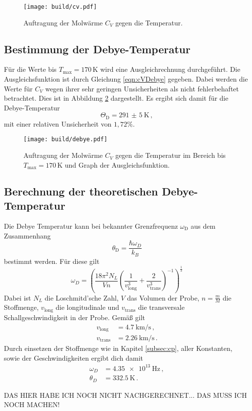 \begin{figure}
  \centering
  \texttt{[image: build/cv.pdf]}
  \caption{Auftragung der Molwärme $C_V$ gegen die Temperatur.}
  \label{fig:cv}
\end{figure}

\subsection{Bestimmung der Debye-Temperatur}
\label{subsec:debye}

Für die Werte bis $T_{\text{max}}=170$\,K wird eine Ausgleichrechnung durchgeführt. Die Ausgleichsfunktion ist durch Gleichung \eqref{eqn:cVDebye} gegeben.
Dabei werden die Werte für $C_V$ wegen ihrer sehr geringen Unsicherheiten als nicht fehlerbehaftet betrachtet. Dies ist in Abbildung \ref{fig:debye} dargestellt. Es ergibt sich damit für die Debye-Temperatur
\begin{equation*}
  \Theta_\text{D}=\SI{291(5)}{\kelvin} \,,
\end{equation*}
mit einer relativen Unsicherheit von $1{,}72\%$.

\begin{figure}
  \centering
  \texttt{[image: build/debye.pdf]}
  \caption{Auftragung der Molwärme $C_V$ gegen die Temperatur im Bereich bis
  $T_{\text{max}}=170$\,K und Graph der Ausgleichsfunktion.}
  \label{fig:debye}
\end{figure}

\subsection{Berechnung der theoretischen Debye-Temperatur}
\label{subsec:debyetheo}

Die Debye Temperatur kann bei bekannter Grenzfrequenz $\omega_\text{D}$ aus dem Zusammenhang
\begin{equation*}
  \theta_\text{D}=\frac{\hbar \omega_D}{k_B}
\end{equation*}
bestimmt werden. Für diese gilt
\begin{equation*}
  \omega_D=\left(\frac{18 \pi^2 N_L}{V n}\left(\frac{1}{v_{\text{long}}^3}+
  \frac{2}{v_{\text{trans}}^3} \right)^{-1} \right)^{\frac{1}{3}}
\end{equation*}
Dabei ist $N_L$ die Loschmitd'sche Zahl, $V$ das Volumen der Probe, $n=\frac{m}{M}$ die Stoffmenge,
$v_{\text{long}}$ die longitudinale und $v_{\text{trans}}$ die transversale Schallgeschwindigkeit
in der Probe. Gemäß \cite{versuchsanleitung} gilt
\begin{align*}
  v_{\text{long}}&= \SI{4.7}{\kilo\metre\per\second} \,,\\
  v_{\text{trans}}&=\SI{2.26}{\kilo\metre\per\second} \,.
\end{align*}
Durch einsetzen der Stoffmenge wie in Kapitel \ref{subsec:cp}, aller Konstanten,
sowie der Geschwindigkeiten ergibt dich damit
\begin{align*}
  \omega_D&=\SI{4.35e13}{\hertz} \,, \\
  \theta_D&=\SI{332.5}{\kelvin} \,.
\end{align*}

DAS HIER HABE ICH NOCH NICHT NACHGERECHNET... DAS MUSS ICH NOCH MACHEN!
